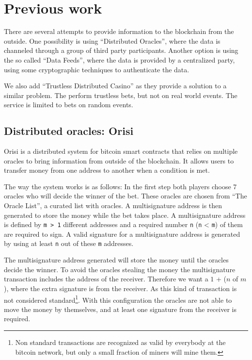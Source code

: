 \section{Previous work} \label{sec:previous_work}

There are several attempts to provide information to the blockchain from the
  outside.
One possibility is using  ``Distributed Oracles'', where the data is channeled
  through a group of third party participants.
Another option is using the so called ``Data Feeds'', where the data is provided
  by a centralized party, using some cryptographic techniques to authenticate
  the data.

We also add ``Trustless Distributed Casino'' as they provide a solution to a
  similar problem.
The perform trustless bets, but not  on real world events.
The service is limited to bets on random events.

\subsection{Distributed oracles: Orisi}
Orisi \cite{orisiwhitepaper} is a distributed system for bitcoin smart
  contracts that relies on multiple oracles to bring information from outside
  of the blockchain.
It allows users to transfer money from one address to another when a condition
  is met.

The way the system works is as follows:
In the first step both players choose 7 oracles who will decide the winner of
  the bet.
These oracles are chosen from ``The Oracle List'', a curated list with oracles.
A multisignature address is then generated to store the money while the bet
  takes place.
A multisignature address is defined by \texttt{m > 1} different addresses and a
  required number \texttt{n} (\texttt{n} < \texttt{m}) of them are required to
  sign.
A valid signature for a multisignature address is generated by using at least
  \texttt{n} out of these \texttt{m} addresses.

The multisignature address generated will store the money until the oracles
  decide the winner.
To avoid the oracles stealing the money the multisignature transaction includes
  the address of the receiver.
Therefore we want a $1$ + ($n$ of $m$), where the extra signature is
  from the receiver.
As this kind of transaction is not considered
  standard\footnote{Non standard transactions are recognized as valid
  by everybody at the bitcoin network, but only a small fraction of
  miners will mine them.}.
 With this configuration the oracles are
  not able to move the money by themselves, and at least one signature
  from the receiver is required.

